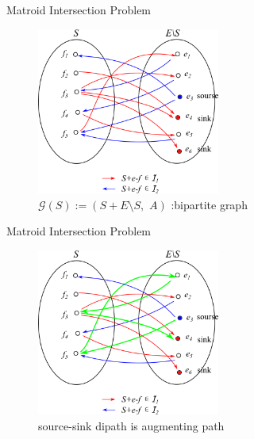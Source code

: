 \documentclass[11pt,xcolor=dvipsnames,table,dvipdfmx]{beamer}
\begin{document}
\begin{frame}{Matroid Intersection Problem}
 \begin{figure}
  \caption{$\mathcal{G}(S) := (S+E \setminus S,\,\, A)$ :bipartite graph}
  \centering
  \includegraphics[width=6cm]{matching.png}\vspace{0.5cm}
 \end{figure}
\end{frame}

\begin{frame}{Matroid Intersection Problem}
 \begin{figure}
  \caption{source-sink dipath is augmenting path}
  \centering
  \includegraphics[width=6cm]{matching2.png}\vspace{0.5cm}
 \end{figure}
\end{frame}
\end{document}
